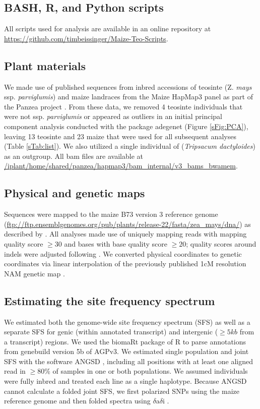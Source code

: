 \documentclass[12pt,a4paper]{article}
\begin{document}
\subsection*{BASH, R, and Python scripts}
All scripts used for analysis are available in an online repository at \url{https://github.com/timbeissinger/Maize-Teo-Scripts}. 

\subsection*{Plant materials}
We made use of published sequences from inbred accessions of teosinte (Z. {\it mays} ssp. {\it parviglumis}) and maize landraces from the Maize HapMap3 panel as part of the Panzea project  \cite{chia2012, lemmon2014, bukowski2015}. 
From these data, we removed 4 teosinte individuals that were not ssp. \textit{parviglumis} or appeared as outliers in an initial principal component analysis conducted with the package adegenet \cite{jombart2011} (Figure \ref{sFig:PCA}), leaving 13 teosinte and 23 maize that were used for all subsequent analyses (Table \ref{sTab:list}). We also utilized a single individual of (\textit{Tripsacum dactyloides}) as an outgroup.  All bam files are available at \url{/iplant/home/shared/panzea/hapmap3/bam\_internal/v3\_bams\_bwamem}. 

\subsection*{Physical and genetic maps}
Sequences were mapped to the maize B73 version 3 reference genome \cite{schnable2009} (\url{ftp://ftp.ensemblgenomes.org/pub/plants/release-22/fasta/zea\_mays/dna/}) as described by \cite{bukowski2015}. 
All analyses made use of uniquely mapping reads with mapping quality score $\geq  30$ and bases with base quality score $\geq 20$; quality scores around indels were adjusted following \cite{li2011statistical}.
We converted physical coordinates to genetic coordinates via linear interpolation of the previously published 1cM resolution NAM genetic map \cite{glaubitz2014}. 

\subsection*{Estimating the site frequency spectrum}
We estimated both the genome-wide site frequency spectrum (SFS) as well as a separate SFS for genic (within annotated transcript) and intergenic ($\geq 5kb$ from a transcript) regions. 
We used the biomaRt package \cite{durinck2009,durinck2005} of R \cite{R2014} to parse annotations from genebuild version 5b of AGPv3. 
We estimated single population and joint SFS with the software ANGSD \cite{korneliussen2014}, including all positions with at least one aligned read in $\geq 80\%$ of samples in one or both populations.
We assumed individuals were fully inbred and treated each line as a single haplotype. Because ANGSD cannot calculate a folded joint SFS, we first polarized SNPs using the maize reference genome and then folded spectra using $\delta$a$\delta$i \cite{gutenkunst2009}.
\end{document}
